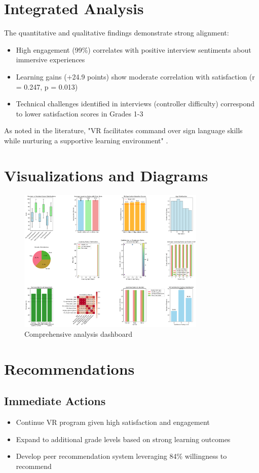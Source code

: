 \documentclass{article}
\begin{document}
\section{Integrated Analysis}
The quantitative and qualitative findings demonstrate strong alignment:
\begin{itemize}
    \item High engagement (99\%) correlates with positive interview sentiments about immersive experiences
    \item Learning gains (+24.9 points) show moderate correlation with satisfaction (r = 0.247, p = 0.013)
    \item Technical challenges identified in interviews (controller difficulty) correspond to lower satisfaction scores in Grades 1-3
\end{itemize}
As noted in the literature, "VR facilitates command over sign language skills while nurturing a supportive learning environment" \cite{alwafi2022social}.

\section{Visualizations and Diagrams}
\begin{figure}[h]
    \centering
    \includegraphics[width=0.8\textwidth]{detailed_vr_analysis_results.png}
    \caption{Comprehensive analysis dashboard}
\end{figure}

\section{Recommendations}
\subsection{Immediate Actions}
\begin{itemize}
    \item Continue VR program given high satisfaction and engagement
    \item Expand to additional grade levels based on strong learning outcomes
    \item Develop peer recommendation system leveraging 84\% willingness to recommend
\end{itemize}
\end{document}
